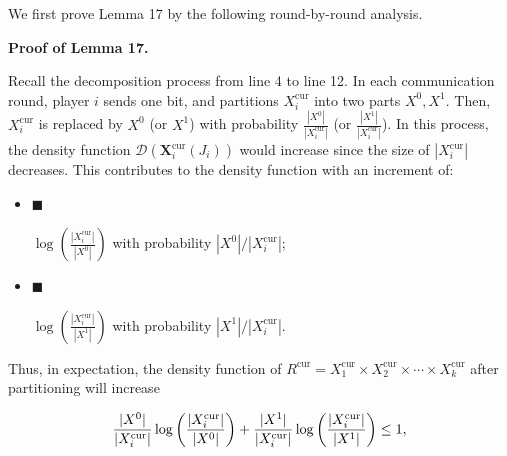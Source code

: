 \documentclass[10pt,a4paper]{article}
\begin{document}
We first prove Lemma 17 by the following round-by-round analysis.\par




\par\medskip\noindent\textbf{Proof of Lemma 17.}\par




Recall the decomposition process from line 4 to line 12. In each communication round, player $i$ sends one bit, and partitions $X_{i}^{\text{cur}}$ into two parts $X^{0},X^{1}$. Then, $X_{i}^{\text{cur}}$ is replaced by $X^{0}$ (or $X^{1}$) with probability $\frac{|X^{0}|}{|X_{i}^{\text{cur}}|}$ (or $\frac{|X^{1}|}{|X_{i}^{\text{cur}}|}$). In this process, the density function $\mathcal{D}(\bm{X}_{i}^{\text{cur}}(J_{i}))$ would increase since the size of $|X_{i}^{\text{cur}}|$ decreases. This contributes to the density function with an increment of:\par


\begin{itemize}


\item[] 
$\blacksquare$ 


$\log(\frac{|X_{i}^{\text{cur}}|}{|X^{0}|})$ with probability $|X^{0}|/|X_{i}^{\text{cur}}|$;\par





\item[] 
$\blacksquare$ 


$\log(\frac{|X_{i}^{\text{cur}}|}{|X^{1}|})$ with probability $|X^{1}|/|X_{i}^{\text{cur}}|$.\par





\end{itemize}


Thus, in expectation, the density function of $R^{\text{cur}}=X_{1}^{\text{cur}}\times X_{2}^{\text{cur}}\times\cdots\times X_{k}^{\text{cur}}$ after partitioning will increase\par


\[\begin{gathered}
\frac{|X^{0}|}{|X_{i}^{\text{cur}}|}\log\bigg{(}\frac{|X_{i}^{\text{cur}}|}{|X^{0}|}\bigg{)}+\frac{|X^{1}|}{|X_{i}^{\text{cur}}|}\log\bigg{(}\frac{|X_{i}^{\text{cur}}|}{|X^{1}|}\bigg{)}\leq 1,
\end{gathered}\]
\end{document}
